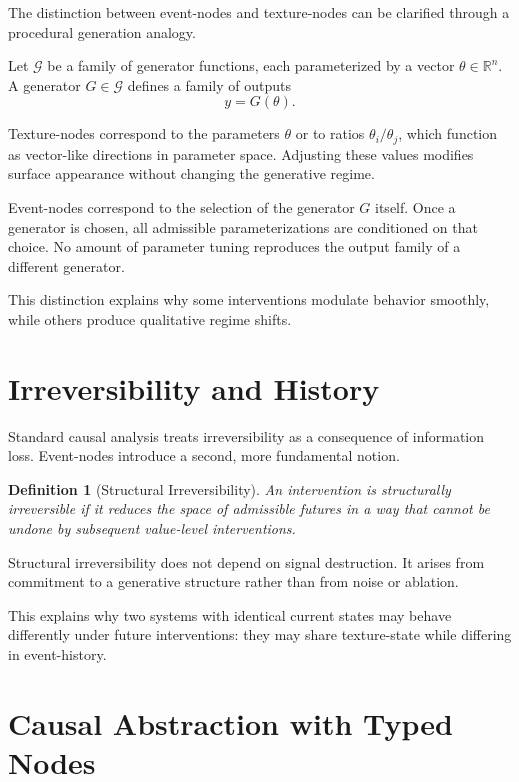 \documentclass[11pt]{article}
\newtheorem{definition}{Definition}
\newcommand{\Gen}{\mathcal{G}}
\begin{document}
The distinction between event-nodes and texture-nodes can be clarified through a
procedural generation analogy.

Let \( \Gen \) be a family of generator functions, each parameterized by a vector
\( \theta \in \mathbb{R}^n \). A generator \( G \in \Gen \) defines a family of
outputs
\[
y = G(\theta).
\]

Texture-nodes correspond to the parameters \( \theta \) or to ratios
\( \theta_i / \theta_j \), which function as vector-like directions in parameter
space. Adjusting these values modifies surface appearance without changing the
generative regime.

Event-nodes correspond to the selection of the generator \( G \) itself. Once a
generator is chosen, all admissible parameterizations are conditioned on that
choice. No amount of parameter tuning reproduces the output family of a
different generator.

This distinction explains why some interventions modulate behavior smoothly,
while others produce qualitative regime shifts.

\section{Irreversibility and History}

Standard causal analysis treats irreversibility as a consequence of information
loss. Event-nodes introduce a second, more fundamental notion.

\begin{definition}[Structural Irreversibility]
An intervention is \emph{structurally irreversible} if it reduces the space of
admissible futures in a way that cannot be undone by subsequent value-level
interventions.
\end{definition}

Structural irreversibility does not depend on signal destruction. It arises from
commitment to a generative structure rather than from noise or ablation.

This explains why two systems with identical current states may behave
differently under future interventions: they may share texture-state while
differing in event-history.

\section{Causal Abstraction with Typed Nodes}
\end{document}
